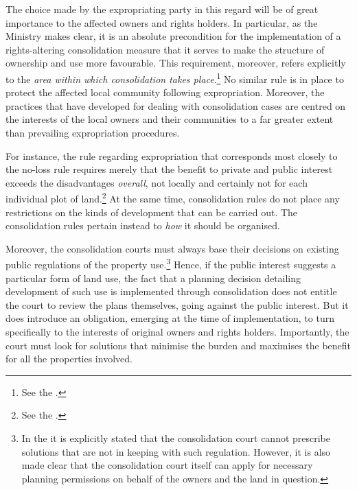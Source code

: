 {The choice made by the expropriating party in this regard will be of great importance to the affected owners and rights holders. In particular, as the Ministry makes clear, it is an absolute precondition for the implementation of a rights-altering consolidation measure that it serves to make the structure of ownership and use more favourable. This requirement, moreover, refers explicitly to the \emph{area within which consolidation takes place}.\footnote{See the \dni\cite[3-3]{lca13}.} No similar rule is in place to protect the affected local community following expropriation. Moreover, the practices that have developed for dealing with consolidation cases are centred on the interests of the local owners and their communities to a far greater extent than prevailing expropriation procedures.

For instance, the rule regarding expropriation that corresponds most closely to the no-loss rule requires merely that the benefit to private and public interest exceeds the disadvantages \emph{overall}, not locally and certainly not for each individual plot of land.\footnote{See the \dni\cite[2]{ea59}.} At the same time, consolidation rules do not place any restrictions on the kinds of development that can be carried out. The consolidation rules pertain instead to \emph{how} it should be organised. 

Moreover, the consolidation courts must always base their decisions on existing public regulations of the property use.\footnote{In the \dni\cite[3-17]{lca13} it is explicitly stated that the consolidation court cannot prescribe solutions that are not in keeping with such regulation. However, it is also made clear that the consolidation court itself can apply for necessary planning permissions on behalf of the owners and the land in question.} Hence, if the public interest suggests a particular form of land use, the fact that a planning decision detailing development of such use is implemented through consolidation does not entitle the court to review the plans themselves, going against the public interest. But it does introduce an obligation, emerging at the time of implementation, to turn specifically to the interests of original owners and rights holders. Importantly, the court must look for solutions that minimise the burden and maximises the benefit for all the properties involved.
}
